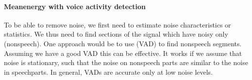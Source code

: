 \documentclass[letterpaper,10pt,english]{jupyterBook}
\begin{document}
\paragraph{Mean\sphinxhyphen{}energy with voice activity detection}
\label{\detokenize{Enhancement/Noise_attenuation:mean-energy-with-voice-activity-detection}}
\sphinxAtStartPar
To be able to remove noise, we first need to estimate noise characteristics or statistics. We thus need to find sections of the signal which have noisy only (non\sphinxhyphen{}speech). One approach would be to use {\hyperref[\detokenize{Recognition/Voice_activity_detection::doc}]{}} (VAD) to find non\sphinxhyphen{}speech segments. Assuming we have a good VAD this can be effective. It works if we assume that noise is stationary, such that the noise on non\sphinxhyphen{}speech parts are similar to the noise in speech\sphinxhyphen{}parts. In general, VADs are accurate only at low noise levels.
\end{document}

